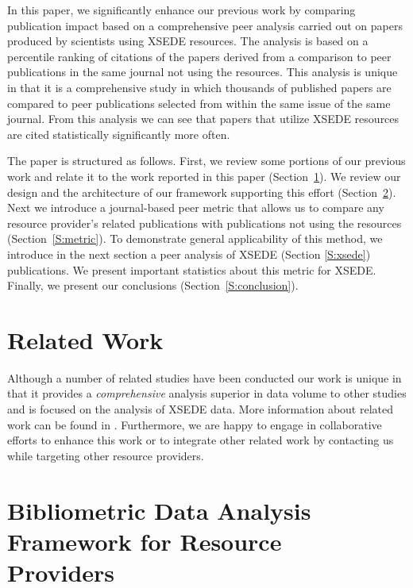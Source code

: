 \documentclass{sig-alternate}
\begin{document}
In this paper, we significantly enhance our previous work by comparing publication impact based on a comprehensive peer analysis carried out on papers produced by scientists using XSEDE resources. The analysis is based on a percentile ranking of citations of the papers derived from a comparison to peer publications in the same journal not using the resources.  This analysis is unique in that it is a comprehensive study in which thousands of published papers are compared to peer publications selected from within the same issue of the same journal. From this analysis we can see that papers that utilize XSEDE resources are cited statistically significantly more often.  

The paper is structured as follows. First, we review some portions of our previous work and relate it to the work reported in this paper (Section~\ref{S:related}). We review our design and the architecture of our framework supporting this effort (Section~\ref{S:framework}). Next we introduce a journal-based peer metric that allows us to compare any resource provider's related publications with publications not using the resources (Section~\ref{S:metric}).  To demonstrate general applicability of this method, we introduce in the next section a peer analysis of XSEDE (Section \ref{S:xsede}) publications. We present important statistics about this metric for XSEDE. Finally, we present our conclusions (Section~\ref{S:conclusion}).

\section{Related Work} \label{S:related}

Although a number of related studies have been conducted
\cite{thomas1998institutional,
  Bollen:2007:MUM:1255175.1255273,Bollen:2008:TUI:1378889.1378928,
  bollen2009principal,bollen2011and} our work is unique in that it provides a {\em comprehensive} analysis superior in data volume to other studies and is focused on the analysis of XSEDE data. More information about related work can be found in \cite{las14impact,las2015cluster}. Furthermore, we are happy to engage in collaborative efforts to enhance this work or to integrate other related work by contacting us while targeting other resource providers.

\section{Bibliometric Data Analysis \\Framework for Resource
  \\Providers} \label{S:framework}
\end{document}

